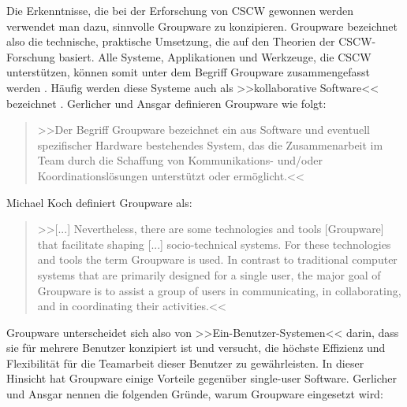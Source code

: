 	\bigskip Die Erkenntnisse, die bei der Erforschung von CSCW gewonnen werden verwendet man dazu, sinnvolle Groupware zu konzipieren. Groupware bezeichnet also die technische, praktische Umsetzung, die auf den Theorien der CSCW-Forschung basiert. Alle Systeme, Applikationen und Werkzeuge, die CSCW unterstützen, können somit unter dem Begriff Groupware zusammengefasst werden \citep{Koch2008, Gerlicher:2007p241}. Häufig werden diese Systeme auch als >>kollaborative Software<< bezeichnet \citep{Bannon:1990p244}. Gerlicher und Ansgar definieren Groupware wie folgt:
	
	\medskip\begin{quote}>>Der Begriff Groupware bezeichnet ein aus Software und eventuell spezifischer Hardware bestehendes System, das die Zusammenarbeit im Team durch die Schaffung von Kommunikations- und/oder Koordinationslösungen unterstützt oder ermöglicht.<< \begin{flushright}\citep{Gerlicher:2007p241}\end{flushright}\end{quote}
	
	\medskip Michael Koch definiert Groupware als:
	
	\medskip\begin{quote}>>[...] Nevertheless, there are some technologies and tools [Groupware] that facilitate shaping [...] socio-technical systems. For these technologies and tools the term Groupware is used. In contrast to traditional computer systems that are primarily designed for a single user, the major goal of Groupware is to assist a group of users in communicating, in collaborating, and in coordinating their activities.<< \begin{flushright}\citep{Koch2008}\end{flushright}\end{quote}
	
	\medskip Groupware unterscheidet sich also von >>Ein-Benutzer-Systemen<< darin, dass sie für mehrere Benutzer konzipiert ist und versucht, die höchste Effizienz und Flexibilität für die Teamarbeit dieser Benutzer zu gewährleisten. In dieser Hinsicht hat Groupware einige Vorteile gegenüber single-user Software. Gerlicher und Ansgar nennen die folgenden Gründe, warum Groupware eingesetzt wird: 
	
